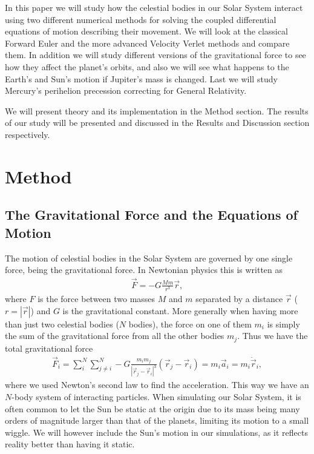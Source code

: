 \documentclass[twocolumn]{aastex62}
\begin{document}
In this paper we will study how the celestial bodies in our Solar System
interact using two different numerical methods for solving the coupled
differential equations of motion describing their movement. We will look at the
classical Forward Euler and the more advanced Velocity Verlet methods and
compare them. In addition we will study different versions of the gravitational
force to see how they affect the planet's orbits, and also we will see what happens
to the Earth's and Sun's motion if Jupiter's mass is changed. Last we will study
Mercury's perihelion precession correcting for General Relativity.

We will present theory and its implementation in the Method section. The results
of our study will be presented and discussed in the Results and Discussion
section respectively.\\


\section{Method} \label{sec:method}
\subsection{The Gravitational Force and the Equations of Motion}\label{subsec:gravity}
The motion of celestial bodies in the Solar System are governed by one single
force, being the gravitational force. In Newtonian physics this is written as
\begin{align}
    \vec{F} = -G\frac{Mm}{r^3}\vec{r},
\end{align}
where $F$ is the force between two masses $M$ and $m$ separated by a distance
$\vec{r}$ ($r = |\vec{r}|$) and $G$ is the gravitational constant. More
generally when having more than just two celestial bodies ($N$ bodies), the force on one of
them $m_i$ is simply the sum of the gravitational force from all the other
bodies $m_j$. Thus we have the total gravitational force 
\begin{align}
    \vec{F}_i = \sum_i^N \sum_{j\neq i}^N -G\frac{m_im_j}{|\vec{r}_j - \vec{r}_i|^3}(\vec{r}_j - \vec{r}_i) = m_i \vec{a}_i = m_i \ddot{\vec{r}}_i,
    \label{eq:newtonian_gravity}
\end{align}
where we used Newton's second law to find the acceleration. This way we have an $N$-body system of interacting particles.
When simulating our Solar System, it is often common to let the Sun be static at
the origin due to its mass being many orders of magnitude larger than that of
the planets, limiting its motion to a small wiggle. We will however include the
Sun's motion in our simulations, as it reflects reality better than having it
static. 
\end{document}
